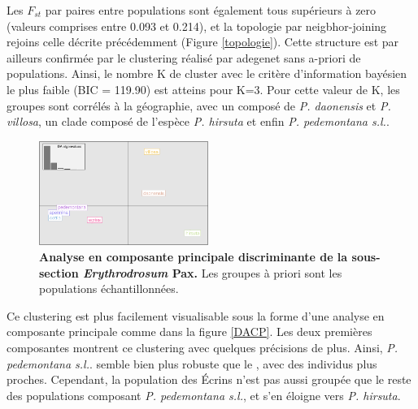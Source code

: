 Les $F_{st}$ par paires entre populations sont également tous supérieurs à zero (valeurs comprises entre 0.093 et 0.214), et la topologie par neigbhor-joining rejoins celle décrite précédemment (Figure \ref{topologie}).
Cette structure est par ailleurs confirmée par le clustering réalisé par adegenet sans a-priori de populations. Ainsi, le nombre K de cluster avec le critère d'information bayésien le plus faible (BIC =   119.90) est atteins pour K=3. Pour cette valeur de K, les groupes sont corrélés à la géographie, avec un  composé de \textit{P. daonensis} et \textit{P. villosa}, un clade composé de l'espèce \textit{P. hirsuta} et enfin \textit{P. pedemontana s.l.}.
\begin{figure}
	\vspace{-20pt}
	\begin{center}
    \includegraphics[width=0.49\textwidth]{fig/DAPC.png}
    \caption{\textbf{Analyse en composante principale discriminante de la sous-section \textit{Erythrodrosum} Pax.} Les groupes à priori sont les populations échantillonnées.}
    \end{center}
    \label{DAPC}
    \vspace{-20pt}
\end{figure}

Ce clustering est plus facilement visualisable sous la forme d'une analyse en composante principale comme dans la figure \ref{DACP}. Les deux premières composantes montrent ce clustering avec quelques précisions de plus. Ainsi, \textit{P. pedemontana s.l.}. semble bien plus robuste que le , avec des individus plus proches. Cependant, la population des Écrins n'est pas aussi groupée que le reste des populations composant \textit{P. pedemontana s.l.}, et s'en éloigne vers \textit{P. hirsuta}.

